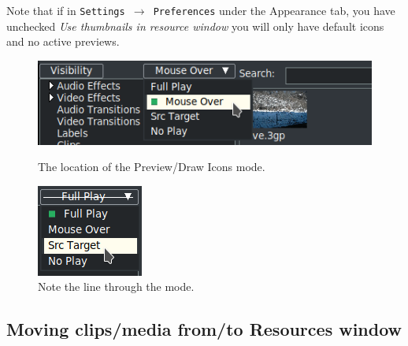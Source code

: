 Note that if in \texttt{Settings $\rightarrow$ Preferences} under the Appearance tab, you have unchecked \textit{Use thumbnails in resource window} you will only have default icons and no active previews.

\begin{figure}[htpb]
    \begin{minipage}{.69\linewidth}
        \centering
        \includegraphics[width=0.99\linewidth]{images/preview_icon_mode.png}
        \caption{The location of the Preview/Draw Icons mode.}
        \label{fig:preview_icon_mode}
    \end{minipage}
    \hfill
    \begin{minipage}{.29\linewidth}
        \vspace{2ex}
        \centering
        \includegraphics[width=0.7\linewidth]{images/line_through_mode.png}
        \caption{Note the line through the mode.}
        \label{fig:line_through_mode}
    \end{minipage}
\end{figure}



\subsection{Moving clips/media from/to Resources window}%
\label{sub:moving_clips_media_from_to_resources_window}


